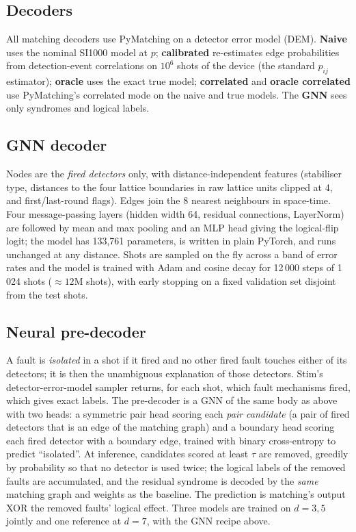 \documentclass[11pt]{article}
\begin{document}
\subsection{Decoders}
All matching decoders use PyMatching on a detector error model (DEM). \textbf{Naive} uses the nominal SI1000 model at $p$; \textbf{calibrated} re-estimates edge probabilities from detection-event correlations on $10^6$ shots of the device (the standard $p_{ij}$ estimator); \textbf{oracle} uses the exact true model; \textbf{correlated} and \textbf{oracle correlated} use PyMatching's correlated mode on the naive and true models. The \textbf{GNN} sees only syndromes and logical labels.

\subsection{GNN decoder}
Nodes are the \emph{fired detectors} only, with distance-independent features (stabiliser type, distances to the four lattice boundaries in raw lattice units clipped at 4, and first/last-round flags). Edges join the 8 nearest neighbours in space-time. Four message-passing layers (hidden width 64, residual connections, LayerNorm) are followed by mean and max pooling and an MLP head giving the logical-flip logit; the model has 133,761 parameters, is written in plain PyTorch, and runs unchanged at any distance. Shots are sampled on the fly across a band of error rates and the model is trained with Adam and cosine decay for 12\,000 steps of 1\,024 shots ($\approx12$M shots), with early stopping on a fixed validation set disjoint from the test shots.

\subsection{Neural pre-decoder}
A fault is \emph{isolated} in a shot if it fired and no other fired fault touches either of its detectors; it is then the unambiguous explanation of those detectors. Stim's detector-error-model sampler returns, for each shot, which fault mechanisms fired, which gives exact labels. The pre-decoder is a GNN of the same body as above with two heads: a symmetric pair head scoring each \emph{pair candidate} (a pair of fired detectors that is an edge of the matching graph) and a boundary head scoring each fired detector with a boundary edge, trained with binary cross-entropy to predict ``isolated''. At inference, candidates scored at least $\tau$ are removed, greedily by probability so that no detector is used twice; the logical labels of the removed faults are accumulated, and the residual syndrome is decoded by the \emph{same} matching graph and weights as the baseline. The prediction is matching's output XOR the removed faults' logical effect. Three models are trained on $d=3,5$ jointly and one reference at $d=7$, with the GNN recipe above.
\end{document}
